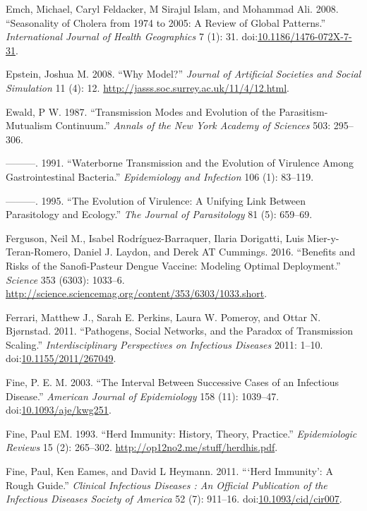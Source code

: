 \documentclass[]{article}
\theoremstyle{definition}
\theoremstyle{definition}
\theoremstyle{definition}
\theoremstyle{remark}
\begin{document}
\hypertarget{ref-emch08}{}
Emch, Michael, Caryl Feldacker, M Sirajul Islam, and Mohammad Ali. 2008.
``Seasonality of Cholera from 1974 to 2005: A Review of Global
Patterns.'' \emph{International Journal of Health Geographics} 7 (1):
31.
doi:\href{https://doi.org/10.1186/1476-072X-7-31}{10.1186/1476-072X-7-31}.

\hypertarget{ref-epstein08}{}
Epstein, Joshua M. 2008. ``Why Model?'' \emph{Journal of Artificial
Societies and Social Simulation} 11 (4): 12.
\url{http://jasss.soc.surrey.ac.uk/11/4/12.html}.

\hypertarget{ref-ewald87}{}
Ewald, P W. 1987. ``Transmission Modes and Evolution of the
Parasitism-Mutualism Continuum.'' \emph{Annals of the New York Academy
of Sciences} 503: 295--306.

\hypertarget{ref-ewald91}{}
---------. 1991. ``Waterborne Transmission and the Evolution of
Virulence Among Gastrointestinal Bacteria.'' \emph{Epidemiology and
Infection} 106 (1): 83--119.

\hypertarget{ref-ewald95}{}
---------. 1995. ``The Evolution of Virulence: A Unifying Link Between
Parasitology and Ecology.'' \emph{The Journal of Parasitology} 81 (5):
659--69.

\hypertarget{ref-ferguson16}{}
Ferguson, Neil M., Isabel Rodríguez-Barraquer, Ilaria Dorigatti, Luis
Mier-y-Teran-Romero, Daniel J. Laydon, and Derek AT Cummings. 2016.
``Benefits and Risks of the Sanofi-Pasteur Dengue Vaccine: Modeling
Optimal Deployment.'' \emph{Science} 353 (6303): 1033--6.
\url{http://science.sciencemag.org/content/353/6303/1033.short}.

\hypertarget{ref-ferrari11}{}
Ferrari, Matthew J., Sarah E. Perkins, Laura W. Pomeroy, and Ottar N.
Bjørnstad. 2011. ``Pathogens, Social Networks, and the Paradox of
Transmission Scaling.'' \emph{Interdisciplinary Perspectives on
Infectious Diseases} 2011: 1--10.
doi:\href{https://doi.org/10.1155/2011/267049}{10.1155/2011/267049}.

\hypertarget{ref-fine03}{}
Fine, P. E. M. 2003. ``The Interval Between Successive Cases of an
Infectious Disease.'' \emph{American Journal of Epidemiology} 158 (11):
1039--47.
doi:\href{https://doi.org/10.1093/aje/kwg251}{10.1093/aje/kwg251}.

\hypertarget{ref-fine93}{}
Fine, Paul EM. 1993. ``Herd Immunity: History, Theory, Practice.''
\emph{Epidemiologic Reviews} 15 (2): 265--302.
\url{http://op12no2.me/stuff/herdhis.pdf}.

\hypertarget{ref-fine11}{}
Fine, Paul, Ken Eames, and David L Heymann. 2011. ```Herd Immunity': A
Rough Guide.'' \emph{Clinical Infectious Diseases : An Official
Publication of the Infectious Diseases Society of America} 52 (7):
911--16.
doi:\href{https://doi.org/10.1093/cid/cir007}{10.1093/cid/cir007}.
\end{document}
